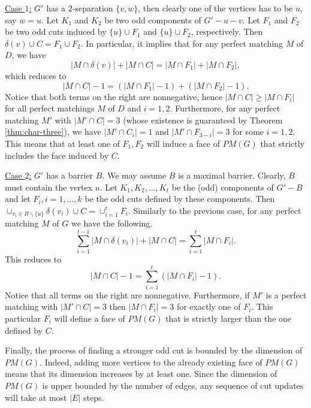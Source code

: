 \documentclass[11pt]{article}
\newcommand{\1}{\mathbf{1}}
\newcommand{\0}{\mathbf{0}}
\begin{document}
\underline{Case $1$:} $G'$ has a $2$-separation $\{v,w\}$, then clearly one of the vertices has to be $u$, say $w=u$. Let $K_1$ and $K_2$ be two odd components of $G'-u-v$. Let $F_1$ and $F_2$ be two odd cuts induced by $\{u\}\cup F_1$ and $\{u\}\cup F_2$, respectively. Then $\delta(v)\cup C=F_1\cup F_2$. In particular, it implies that for any perfect matching $M$ of $D$, we have \begin{equation*}
    |M\cap \delta(v)|+|M\cap C| = |M\cap F_1|+|M\cap F_2|,
\end{equation*} which reduces to \begin{equation*}
    |M\cap C|-1 = (|M\cap F_1|-1)+(|M\cap F_2|-1).
\end{equation*}
Notice that both terms on the right are nonnegative, hence $|M\cap C|\geq |M\cap F_i|$ for all perfect matchings $M$ of $D$ and $i=1,2$. Furthermore, for any perfect matching $M'$ with $|M'\cap C|= 3$ (whose existence is guaranteed by Theorem \ref{thm:char-three}), we have $|M'\cap C_i|=1$ and $|M'\cap F_{3-i}|=3$ for some $i=1,2$. This means that at least one of $F_1, F_2$ will induce a face of $PM(G)$ that strictly includes the face induced by $C$. 

\underline{Case $2$:} $G'$ has a barrier $B$. We may assume $B$ is a maximal barrier. Clearly, $B$ must contain the vertex $u$. Let $K_1, K_2, \ldots, K_t$ be the (odd) components of $G'-B$ and let $F_i, i=1,\ldots,k$ be the odd cuts defined by these components. Then $\cup_{v_i\in B\backslash \{u\}}\delta(v_i) \cup C = \cup_{i=1}^t F_i$. Similarly to the previous case, for any perfect matching $M$ of $G$ we have the following. \begin{equation*}
    \sum_{i=1}^{t-1}|M\cap \delta(v_i)|+|M\cap C| =\sum_{i=1}^t|M\cap F_i|. 
\end{equation*} This reduces to\begin{equation*}
    |M\cap C|-1 = \sum_{i=1}^t (|M\cap F_i|-1).
\end{equation*}
Notice that all terms on the right are nonnegative. Furthermore, if $M'$ is a perfect matching with $|M'\cap C|=3$ then $|M\cap F_i|=3$ for exactly one of $F_i$. This particular $F_i$ will define a face of $PM(G)$ that is strictly larger than the one defined by $C$.

Finally, the process of finding a stronger odd cut is bounded by the dimension of $PM(G)$. Indeed, adding more vertices to the already existing face of $PM(G)$ means that its dimension increases by at least one. Since the dimension of $PM(G)$ is upper bounded by the number of edges, any sequence of cut updates will take at most $|E|$ steps.
\end{document}
